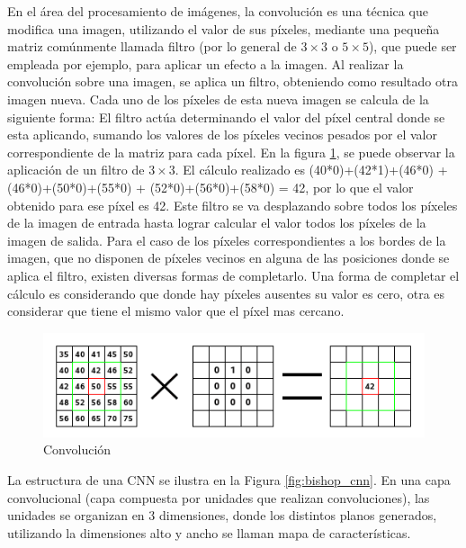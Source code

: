 \documentclass[a4paper,11pt,spanish]{book}
\begin{document}
      En el área del procesamiento de imágenes, la convolución es una técnica que modifica una imagen, utilizando el valor de sus píxeles,
      mediante una pequeña matriz comúnmente llamada filtro (por lo general de $3\times3$ o $5\times5$), que puede ser empleada por ejemplo, para aplicar un efecto 
      a la imagen.
      Al realizar la convolución sobre una imagen, se aplica un filtro, obteniendo como resultado otra imagen nueva. Cada uno de los píxeles de esta nueva imagen se 
      calcula de la siguiente forma:
      El filtro actúa determinando el valor del píxel central donde se esta aplicando, sumando los valores de los píxeles vecinos pesados por el valor correspondiente de la matriz para
      cada píxel. En la figura \ref{fig:convolution}, se puede observar la aplicación de un filtro de $3\times3$. El cálculo realizado es (40*0)+(42*1)+(46*0) + (46*0)+(50*0)+(55*0) + (52*0)+(56*0)+(58*0) = 42,
      por lo que el valor obtenido para ese píxel es 42.
      Este filtro se va desplazando sobre todos los píxeles de la imagen de entrada hasta lograr calcular el valor todos los píxeles de la imagen de salida. 
      Para el caso de los píxeles correspondientes a los bordes de la imagen, que no disponen de píxeles vecinos en alguna de las posiciones donde se aplica el filtro, 
      existen diversas formas de completarlo. 
      Una forma de completar el cálculo es considerando que donde hay píxeles ausentes su valor es cero, otra es considerar que tiene el mismo valor que el píxel mas 
      cercano.
      
      \begin{figure}[h]
	\begin{center}
	\includegraphics[width=0.8\linewidth]{./img/convolution.png}
	\end{center}
	\caption{Convolución}
	\label{fig:convolution}
      \end{figure}

      La estructura de una CNN se ilustra en la Figura \ref{fig:bishop_cnn}. En una capa convolucional (capa compuesta por unidades que realizan convoluciones), 
      las unidades se organizan en 3 dimensiones, donde los distintos planos generados, utilizando la dimensiones alto y ancho se llaman mapa de características.
      
\end{document}
